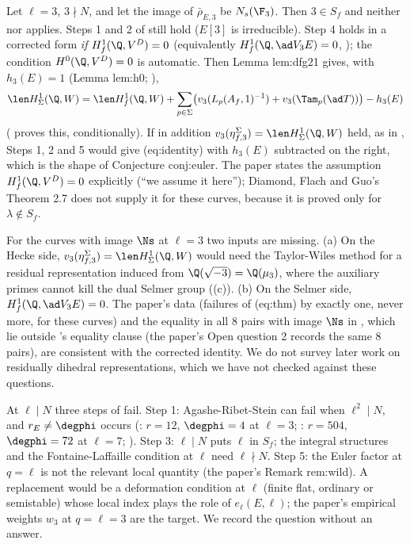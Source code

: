 \begin{remark}\label{rem:congruence:rem-ns}
Let $\ell=3$, $3\nmid N$, and let the image of $\bar\rho_{E,3}$ be $N_s(\F_3)$. Then $3\in S_f$ and neither  nor  applies. Steps 1 and 2 of
 still hold ($E[3]$ is irreducible). Step 4 holds in a corrected form \emph{if} $H^1_f(\Q,V^D)=0$ (equivalently $H^1_f(\Q,\ad V_3E)=0$, ); the condition
$H^0(\Q,V^D)=0$ is automatic. Then Lemma lem:dfg21 gives, with $h_3(E)=1$ (Lemma lem:h0; ),
\[
\len H^1_\Sigma(\Q,W)=\len H^1_f(\Q,W)+\sum_{p\in\Sigma}\bigl(v_3(L_p(A_f,1)^{-1})+v_3(\Tam_p(\ad T))\bigr)-h_3(E)
\]
( proves this, conditionally). If in addition $v_3(\eta^\Sigma_{f,3})=\len H^1_\Sigma(\Q,W)$ held, as in , Steps 1, 2 and 5 would give (eq:identity) with $h_3(E)$
subtracted on the right, which is the shape of Conjecture conj:euler. The paper states the assumption $H^1_f(\Q,V^D)=0$ explicitly (``we assume it here''); Diamond, Flach and Guo's Theorem 2.7 does
not supply it for these curves, because it is proved only for $\lambda\notin S_f$.
\end{remark}

\begin{remark}\label{rem:congruence:open-question-2}
For the curves with image $\Ns$ at $\ell=3$ two inputs are missing. (a) On the Hecke side, $v_3(\eta^\Sigma_{f,3})=\len H^1_\Sigma(\Q,W)$ would need the Taylor-Wiles method for a residual representation induced
from $\Q(\sqrt{-3})=\Q(\mu_3)$, where the auxiliary primes cannot kill the dual Selmer group ((c)). (b) On the Selmer side, $H^1_f(\Q,\ad V_3E)=0$. The paper's data
(failures of (eq:thm) by exactly one, never more, for these curves) and the equality in all $8$ pairs with image $\Ns$ in , which lie outside
's equality clause (the paper's Open question 2 records the same $8$ pairs), are consistent with the corrected identity. We do not survey later work on residually dihedral representations, which we have not checked
against these questions.
\end{remark}

\begin{remark}\label{rem:congruence:open-question-1}
At $\ell\mid N$ three steps of  fail. Step 1: Agashe-Ribet-Stein can fail when $\ell^2\mid N$, and $r_E\ne\degphi$ occurs (: $r=12$, $\degphi=4$ at $\ell=3$; : $r=504$,
$\degphi=72$ at $\ell=7$; ). Step 3: $\ell\mid N$ puts $\ell$ in $S_f$; the integral structures and the Fontaine-Laffaille condition at $\ell$ need $\ell\nmid N$. Step 5: the Euler factor at $q=\ell$ is not
the relevant local quantity (the paper's Remark rem:wild). A replacement would be a deformation condition at $\ell$ (finite flat, ordinary or semistable) whose local index plays the role of
$e_\ell(E,\ell)$; the paper's empirical weights $w_3$ at $q=\ell=3$ are the target. We record the question without an answer.
\end{remark}

